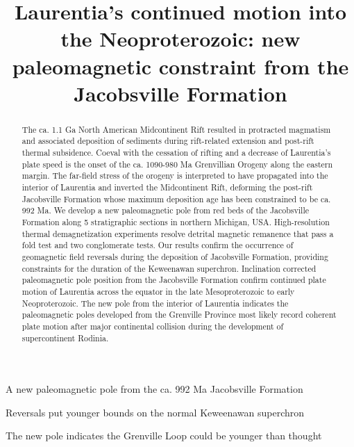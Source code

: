 \documentclass[draft]{agujournal2019}
\begin{document}
\title{Laurentia's continued motion into the Neoproterozoic: new paleomagnetic constraint from the Jacobsville Formation}




\begin{keypoints}
\item A new paleomagnetic pole from the ca. 992 Ma Jacobsville Formation 
\item Reversals put younger bounds on the normal Keweenawan superchron 
\item The new pole indicates the Grenville Loop could be younger than thought
\end{keypoints}


\begin{abstract}
The ca. 1.1 Ga North American Midcontinent Rift resulted in protracted magmatism and associated deposition of sediments during rift-related extension and post-rift thermal subsidence. Coeval with the cessation of rifting and a decrease of Laurentia's plate speed is the onset of the ca. 1090-980 Ma Grenvillian Orogeny along the eastern margin. The far-field stress of the orogeny is interpreted to have propagated into the interior of Laurentia and inverted the Midcontinent Rift, deforming the post-rift Jacobsville Formation whose maximum deposition age has been constrained to be ca. 992 Ma. We develop a new paleomagnetic pole from red beds of the Jacobsville Formation along 5 stratigraphic sections in northern Michigan, USA. High-resolution thermal demagnetization experiments resolve detrital magnetic remanence that pass a fold test and two conglomerate tests. Our results confirm the occurrence of geomagnetic field reversals during the deposition of Jacobsville Formation, providing constraints for the duration of the Keweenawan superchron. Inclination corrected paleomagnetic pole position from the Jacobsville Formation confirm continued plate motion of Laurentia across the equator in the late Mesoproterozoic to early Neoproterozoic. The new pole from the interior of Laurentia indicates the paleomagnetic poles developed from the Grenville Province most likely record coherent plate motion after major continental collision during the development of supercontinent Rodinia.
\end{abstract}
\end{document}
